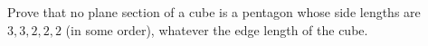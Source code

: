 Prove that no plane section of a cube is a pentagon whose side lengths are $3,3,2,2,2$ (in some order), whatever the edge length of the cube.

